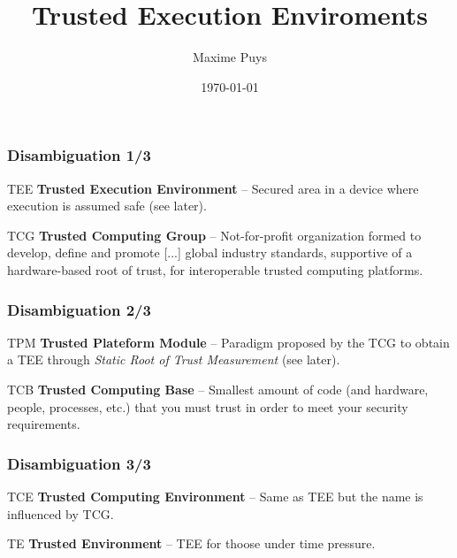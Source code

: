\documentclass{beamer}
\title{Trusted Execution Enviroments}
\author{Maxime Puys}
\date{\today}
\begin{document}
\begin{frame}
    \maketitle
\end{frame}

\begin{frame}
    \frametitle{Disambiguation 1/3}

    \begin{block}{TEE}
        {\bf Trusted Execution Environment} -- Secured area in a device where execution is assumed safe (see later).
    \end{block}
    \vfill
    \begin{block}{TCG}
        {\bf Trusted Computing Group} -- Not-for-profit organization formed to develop, define and promote [...] global industry standards, supportive of a hardware-based root of trust, for interoperable trusted computing platforms.
    \end{block}
\end{frame}

\begin{frame}
    \frametitle{Disambiguation 2/3}
    \begin{block}{TPM}
        {\bf Trusted Plateform Module} -- Paradigm proposed by the TCG to obtain a TEE through {\em Static Root of Trust Measurement} (see later).
    \end{block}
    \vfill
    \begin{block}{TCB}
        {\bf Trusted Computing Base} -- Smallest amount of code (and hardware, people, processes, etc.) that you must trust in order to meet your security requirements.
    \end{block}
\end{frame}

\begin{frame}
    \frametitle{Disambiguation 3/3}
    \begin{block}{TCE}
        {\bf Trusted Computing Environment} -- Same as TEE but the name is influenced by TCG.
    \end{block}
    \vfill
    \begin{block}{TE}
        {\bf Trusted Environment} -- TEE for thoose under time pressure.
    \end{block}
\end{frame}

\begin{frame}
    \tableofcontents
\end{frame}
\end{document}
